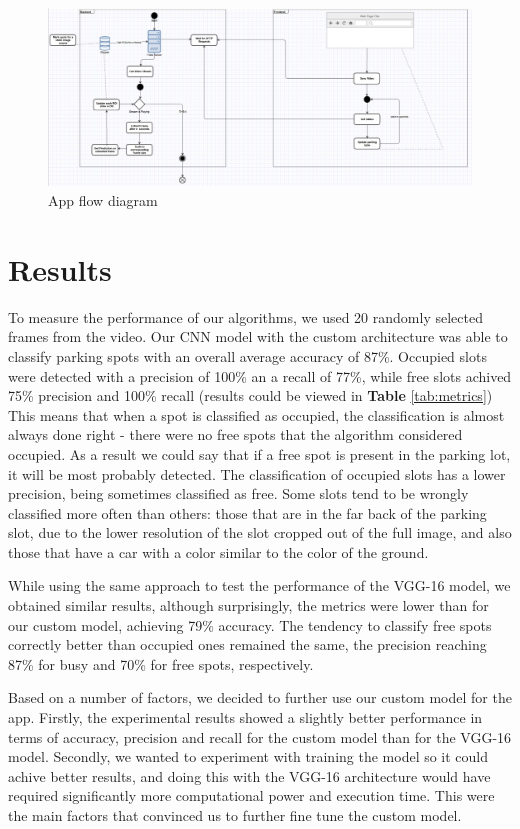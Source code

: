 \documentclass[runningheads,a4paper,11pt]{report}
\begin{document}
\begin{figure}[htbp]
	\centerline{\includegraphics[width=18cm]{images/flow}}   
	\caption{App flow diagram}
	\label{fig:flowimg}
\end{figure}

\section{Results}
\label{section:results}

To measure the performance of our algorithms, we used 20 randomly selected frames from the video. Our CNN model with the custom architecture was able to classify parking spots with an overall average accuracy of 87\%. Occupied slots were detected with a precision of 100\% an a recall of 77\%, while free slots achived 75\% precision and 100\% recall (results could be viewed in \textbf{Table} \ref{tab:metrics}) This means that when a spot is classified as occupied, the classification is almost always done right - there were no free spots that the algorithm considered occupied. As a result we could say that if a free spot is present in the parking lot, it will be most probably detected. The classification of occupied slots has a lower precision, being sometimes classified as free. Some slots tend to be wrongly classified more often than others: those that are in the far back of the parking slot, due to the lower resolution of the slot cropped out of the full image, and also those that have a car with a color similar to the color of the ground.

While using the same approach to test the performance of the VGG-16 model, we obtained similar results, although surprisingly, the metrics were lower than for our custom model, achieving 79\% accuracy. The tendency to classify free spots correctly better than occupied ones remained the same, the precision reaching 87\% for busy and 70\% for free spots, respectively. 

Based on a number of factors, we decided to further use our custom model for the app. Firstly, the experimental results showed a slightly better performance in terms of accuracy, precision and recall for the custom model than for the VGG-16 model. Secondly, we wanted to experiment with training the model so it could achive better results, and doing this with the VGG-16 architecture would have required significantly more computational power and execution time. This were the main factors that convinced us to further fine tune the custom model.
\end{document}
